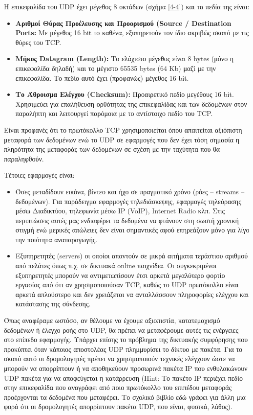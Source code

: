 Η επικεφαλίδα του UDP έχει μέγεθος 8 οκτάδων (σχήμα \ref{4-4}) και τα πεδία της είναι:

\begin{itemize}
\item \textbf{Αριθμοί Θύρας Προέλευσης και Προορισμού (Source / Destination Ports:} Με μέγεθος 16 bit το καθένα, εξυπηρετούν τον ίδιο ακριβώς σκοπό με τις θύρες του TCP.
\item \textbf{Μήκος Datagram (Length):} Το ελάχιστο μέγεθος είναι 8 bytes (μόνο η επικεφαλίδα δηλαδή) και το μέγιστο 65535 bytes (64 Kb) μαζί με την επικεφαλίδα. Το πεδίο αυτό έχει (προφανώς) μέγεθος 16 bit.
\item \textbf{Το Άθροισμα Ελέγχου (Checksum):} Προαιρετικό πεδίο μεγέθους 16 bit. Χρησιμεύει για επαλήθευση ορθότητας της επικεφαλίδας και των δεδομένων στον παραλήπτη και λειτουργεί παρόμοια με το αντίστοιχο πεδίο του TCP. 
\end{itemize}

Είναι προφανές ότι το πρωτόκολλο TCP χρησιμοποιείται όπου απαιτείται αξιόπιστη μεταφορά των δεδομένων ενώ το UDP σε εφαρμογές που δεν έχει τόση σημασία η πληρότητα της μεταφοράς των δεδομένων σε σχέση με την ταχύτητα που θα παραληφθούν.

Τέτοιες εφαρμογές είναι:

\begin{itemize}
\item Όσες μεταδίδουν εικόνα, βίντεο και ήχο σε πραγματικό χρόνο (ρόες -- streams -- δεδομένων). Για παράδειγμα εφαρμογές τηλεδιάσκεψης, εφαρμογές τηλεόρασης μέσω Διαδικτύου, τηλεφωνία μέσω IP (VoIP), Internet Radio κλπ. Στις περιπτώσεις αυτές μας ενδιαφέρει τα δεδομένα να φτάνουν στη σωστή χρονική στιγμή ενώ μερικές απώλειες δεν είναι σημαντικές αφού επηρεάζουν μόνο για λίγο την ποιότητα αναπαραγωγής.
\item Εξυπηρετητές (servers) οι οποίοι απαντούν σε μικρά αιτήματα τεράστιου αριθμού από πελάτες όπως π.χ. σε δικτυακά online παιχνίδια. Οι συγκεκριμένοι εξυπηρετητές μπορούν να αντιμετωπίσουν έτσι αρκετά μεγαλύτερο φορτίο εργασίας από ότι αν χρησιμοποιούσαν TCP, καθώς το UDP πρωτόκολλο είναι αρκετά απλούστερο και δεν χρειάζεται να ανταλλάσσουν πληροφορίες ελέγχου και κατάστασης της σύνδεσης. 
\end{itemize}

Όπως αναφέραμε ωστόσο, αν θέλουμε να έχουμε αξιοπιστία, κατατεμαχισμό δεδομένων ή έλεγχο ροής στο UDP, θα πρέπει να μεταφέρουμε αυτές τις ενέργειες στο επίπεδο εφαρμογής. Υπάρχει επίσης το πρόβλημα της δικτυακής συμφόρησης που προκύπτει όταν κάποιος αποστολέας UDP πλημμυρίσει το δίκτυο με πακέτα. Για το σκοπό αυτό οι δρομολογητές πρέπει να χρησιμοποιούν τεχνικές ελέγχουν ώστε να μπορούν να απορρίπτουν ή να αποθηκεύουν προσωρινά πακέτα IP που ενθυλακώνουν UDP πακέτα για να αποφεύγεται η κατάρρευση (Hint: Το πακέτο IP περιέχει πεδίο στην επικεφαλίδα που αναγράφει από ποιο πρωτόκολλο του επιπέδου μεταφοράς προέρχονται τα δεδομένα που μεταφέρει. Το σχολικό βιβλίο εδώ γράφει για άλλη μια φορά ότι οι δρομολογητές απορρίπτουν πακέτα UDP, που είναι, φυσικά, λάθος).